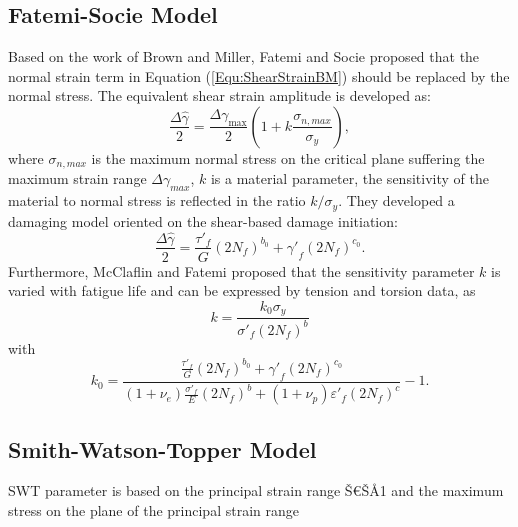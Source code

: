 \documentclass[preprint,5p,twocolumn,11pt,sort&compress]{elsarticle}
\begin{document}
\subsection{Fatemi-Socie Model}
Based on the work of Brown and Miller, Fatemi and Socie \cite{Fatemi1988} proposed that the normal strain term in Equation (\ref{Equ:ShearStrainBM}) should be replaced by the normal stress.
The equivalent shear strain amplitude is developed as:
\begin{equation}
\frac{{\Delta \hat \gamma }}{2} = \frac{{\Delta {\gamma _{\max }}}}{2}\left( {1 + k\frac{{{\sigma _{n,max}}}}{{{\sigma _y}}}} \right),
\end{equation}
where
$\sigma _{n,max}$ is the maximum normal stress on the critical plane suffering the maximum strain range $\Delta {\gamma _{max}}$, $k$ is a material parameter, the sensitivity of the material to normal stress is reflected in the ratio $k/\sigma_y$.
They developed a damaging model oriented on the shear-based damage initiation:
\begin{equation}
\frac{{\Delta \hat \gamma }}{2} = \frac{{{{\tau '}_f}}}{G}{\left( {2{N_f}} \right)^{{b_0}}} + {{\gamma '}_f}{\left( {2{N_f}} \right)^{{c_0}}}.
\end{equation}
Furthermore, McClaflin and Fatemi \cite{McClaflin2004} proposed that the sensitivity parameter $k$ is varied with fatigue life and can be expressed by tension and torsion data, as
\begin{equation}
k =  \frac{{k_0 {\sigma _y}}}{{{{\sigma '}_f}{{\left( {2{N_f}} \right)}^b}}}
\end{equation}
with
\[
k_0 =  {\frac{{\frac{{{{\tau '}_f}}}{G}{{\left( {2{N_f}} \right)}^{{b_0}}} + {{\gamma '}_f}{{\left( {2{N_f}} \right)}^{{c_0}}}}}{{\left( {1 + {\nu _e}} \right)\frac{{{{\sigma '}_f}}}{E}{{\left( {2{N_f}} \right)}^b} + \left( {1 + {\nu _p}} \right){{\varepsilon '}_f}{{\left( {2{N_f}} \right)}^c}}} - 1} .
\]


\subsection{Smith-Watson-Topper Model}
SWT parameter is based on the principal strain range Š€ŠÅ1 and the maximum stress on the plane of the principal
strain range
\end{document}

